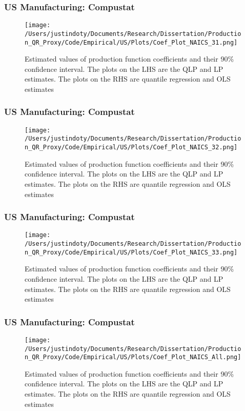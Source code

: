 \documentclass{beamer}
\begin{document}
\begin{frame}
\frametitle{US Manufacturing: Compustat}
\begin{figure}[ht]
\centering
\texttt{[image: /Users/justindoty/Documents/Research/Dissertation/Production\_QR\_Proxy/Code/Empirical/US/Plots/Coef\_Plot\_NAICS\_31.png]}
\caption{Estimated values of production function coefficients and their 90\% confidence interval. The plots on the LHS are the QLP and LP estimates. The plots on the RHS are quantile regression and OLS estimates}
\end{figure}
\end{frame}

\begin{frame}
\frametitle{US Manufacturing: Compustat}
\begin{figure}[ht]
\centering
\texttt{[image: /Users/justindoty/Documents/Research/Dissertation/Production\_QR\_Proxy/Code/Empirical/US/Plots/Coef\_Plot\_NAICS\_32.png]}
\caption{Estimated values of production function coefficients and their 90\% confidence interval. The plots on the LHS are the QLP and LP estimates. The plots on the RHS are quantile regression and OLS estimates}
\end{figure}
\end{frame}

\begin{frame}
\frametitle{US Manufacturing: Compustat}
\begin{figure}[ht]
\centering
\texttt{[image: /Users/justindoty/Documents/Research/Dissertation/Production\_QR\_Proxy/Code/Empirical/US/Plots/Coef\_Plot\_NAICS\_33.png]}
\caption{Estimated values of production function coefficients and their 90\% confidence interval. The plots on the LHS are the QLP and LP estimates. The plots on the RHS are quantile regression and OLS estimates}
\end{figure}
\end{frame}

\begin{frame}
\frametitle{US Manufacturing: Compustat}
\begin{figure}[ht]
\centering
\texttt{[image: /Users/justindoty/Documents/Research/Dissertation/Production\_QR\_Proxy/Code/Empirical/US/Plots/Coef\_Plot\_NAICS\_All.png]}
\caption{Estimated values of production function coefficients and their 90\% confidence interval. The plots on the LHS are the QLP and LP estimates. The plots on the RHS are quantile regression and OLS estimates}
\end{figure}
\end{frame}
\end{document}
